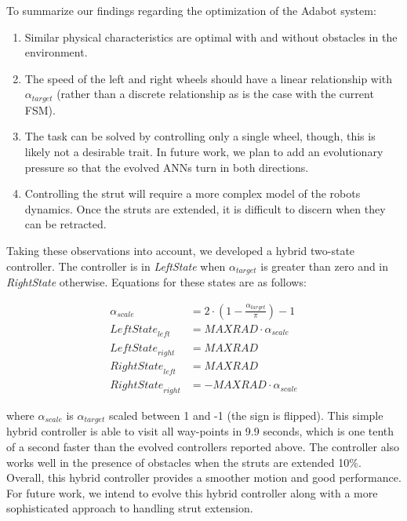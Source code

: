 To summarize our findings regarding the optimization of the Adabot system:

\begin{enumerate}

\item Similar physical characteristics are optimal with and without obstacles in the environment.

\item The speed of the left and right wheels should have a linear relationship with $\alpha_{\mathit{target}}$ (rather than a discrete relationship as is the case with the current FSM).

\item The task can be solved by controlling only a single wheel, though, this is likely not a desirable trait. In future work, we plan to add an evolutionary pressure so that the evolved ANNs turn in both directions.

\item Controlling the strut will require a more complex model of the robots dynamics. Once the struts are extended, it is difficult to discern when they can be retracted.

\end{enumerate}

Taking these observations into account, we developed a hybrid two-state controller. The controller is in \emph{LeftState} when $\alpha_{\mathit{target}}$ is greater than zero and in \emph{RightState} otherwise. Equations for these states are as follows:

\vspace{-0.1in}

\begin{align}
    \alpha_\mathit{scale} &= 2\cdot(1 - \frac{\alpha_{\mathit{target}}}{\pi}) - 1\\
    \mathit{LeftState}_\mathit{left} &= \mathit{MAXRAD} \cdot \alpha_\mathit{scale}\\
    \mathit{LeftState}_\mathit{right} &= \mathit{MAXRAD}\\
    \mathit{RightState}_\mathit{left} &= \mathit{MAXRAD}\\
    \mathit{RightState}_\mathit{right} &= -\mathit{MAXRAD}\cdot \alpha_\mathit{scale}
\end{align}

\noindent
where $\alpha_\mathit{scale}$ is $\alpha_{\mathit{target}}$ scaled between 1 and -1 (the sign is flipped). This simple hybrid controller is able to visit all way-points in 9.9 seconds, which is one tenth of a second faster than the evolved controllers reported above. The controller also works well in the presence of obstacles when the struts are extended 10\%. Overall, this hybrid controller provides a smoother motion and good performance. For future work, we intend to evolve this hybrid controller along with a more sophisticated approach to handling strut extension.
